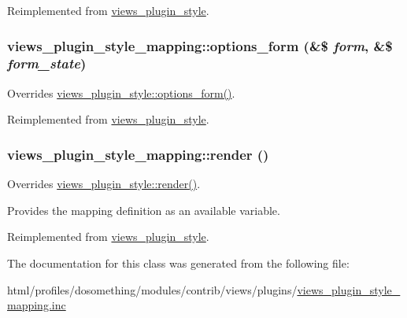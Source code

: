 Reimplemented from \hyperlink{classviews__plugin__style}{views\_\-plugin\_\-style}.\hypertarget{classviews__plugin__style__mapping_a3aa280e8dac5c6d0cdc33418bfa1736c}{
\subsubsection[{options\_\-form}]{\setlength{\rightskip}{0pt plus 5cm}views\_\-plugin\_\-style\_\-mapping::options\_\-form (\&\$ {\em form}, \/  \&\$ {\em form\_\-state})}}
\label{classviews__plugin__style__mapping_a3aa280e8dac5c6d0cdc33418bfa1736c}
Overrides \hyperlink{classviews__plugin__style_afe3d437ff4398315b15c4e60975dbb1c}{views\_\-plugin\_\-style::options\_\-form()}. 

Reimplemented from \hyperlink{classviews__plugin__style_afe3d437ff4398315b15c4e60975dbb1c}{views\_\-plugin\_\-style}.\hypertarget{classviews__plugin__style__mapping_a0abe9d256844104b89045980cf991782}{
\subsubsection[{render}]{\setlength{\rightskip}{0pt plus 5cm}views\_\-plugin\_\-style\_\-mapping::render ()}}
\label{classviews__plugin__style__mapping_a0abe9d256844104b89045980cf991782}
Overrides \hyperlink{classviews__plugin__style_aa52b618e91b11a7d10ad1feadbc891f1}{views\_\-plugin\_\-style::render()}.

Provides the mapping definition as an available variable. 

Reimplemented from \hyperlink{classviews__plugin__style_aa52b618e91b11a7d10ad1feadbc891f1}{views\_\-plugin\_\-style}.

The documentation for this class was generated from the following file:\begin{DoxyCompactItemize}
\item 
html/profiles/dosomething/modules/contrib/views/plugins/\hyperlink{views__plugin__style__mapping_8inc}{views\_\-plugin\_\-style\_\-mapping.inc}\end{DoxyCompactItemize}
